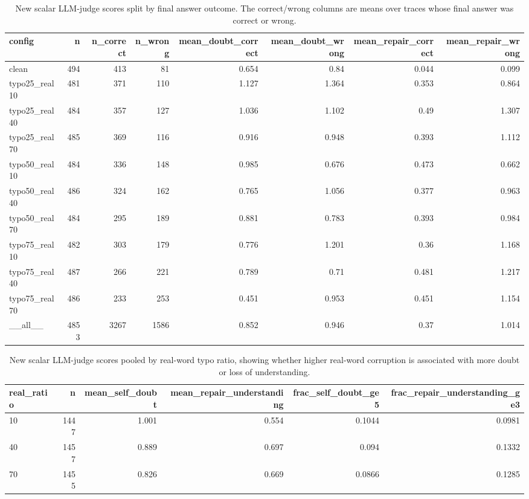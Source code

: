\documentclass[11pt]{article}
\begin{document}
\begin{table}[H]
\centering
\caption{New scalar LLM-judge scores split by final answer outcome. The correct/wrong columns are means over traces whose final answer was correct or wrong.}
\small
\begin{adjustbox}{max width=\textwidth}
\begin{tabular}{lrrrrrrr}
\toprule
\textbf{config} & \textbf{n} & \textbf{n\_correct} & \textbf{n\_wrong} & \textbf{mean\_doubt\_correct} & \textbf{mean\_doubt\_wrong} & \textbf{mean\_repair\_correct} & \textbf{mean\_repair\_wrong} \\
\midrule
clean & 494 & 413 & 81 & 0.654 & 0.84 & 0.044 & 0.099 \\
typo25\_real10 & 481 & 371 & 110 & 1.127 & 1.364 & 0.353 & 0.864 \\
typo25\_real40 & 484 & 357 & 127 & 1.036 & 1.102 & 0.49 & 1.307 \\
typo25\_real70 & 485 & 369 & 116 & 0.916 & 0.948 & 0.393 & 1.112 \\
typo50\_real10 & 484 & 336 & 148 & 0.985 & 0.676 & 0.473 & 0.662 \\
typo50\_real40 & 486 & 324 & 162 & 0.765 & 1.056 & 0.377 & 0.963 \\
typo50\_real70 & 484 & 295 & 189 & 0.881 & 0.783 & 0.393 & 0.984 \\
typo75\_real10 & 482 & 303 & 179 & 0.776 & 1.201 & 0.36 & 1.168 \\
typo75\_real40 & 487 & 266 & 221 & 0.789 & 0.71 & 0.481 & 1.217 \\
typo75\_real70 & 486 & 233 & 253 & 0.451 & 0.953 & 0.451 & 1.154 \\
\_\_all\_\_ & 4853 & 3267 & 1586 & 0.852 & 0.946 & 0.37 & 1.014 \\
\bottomrule
\end{tabular}
\end{adjustbox}
\end{table}

\begin{table}[H]
\centering
\caption{New scalar LLM-judge scores pooled by real-word typo ratio, showing whether higher real-word corruption is associated with more doubt or loss of understanding.}
\small
\begin{adjustbox}{max width=\textwidth}
\begin{tabular}{lrrrrr}
\toprule
\textbf{real\_ratio} & \textbf{n} & \textbf{mean\_self\_doubt} & \textbf{mean\_repair\_understanding} & \textbf{frac\_self\_doubt\_ge5} & \textbf{frac\_repair\_understanding\_ge3} \\
\midrule
10 & 1447 & 1.001 & 0.554 & 0.1044 & 0.0981 \\
40 & 1457 & 0.889 & 0.697 & 0.094 & 0.1332 \\
70 & 1455 & 0.826 & 0.669 & 0.0866 & 0.1285 \\
\bottomrule
\end{tabular}
\end{adjustbox}
\end{table}
\end{document}
